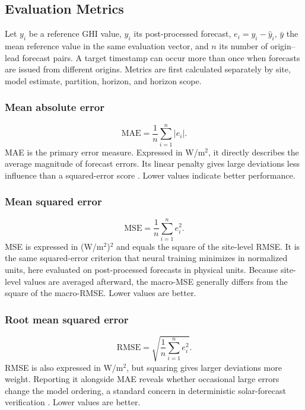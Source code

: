 \subsection{Evaluation Metrics}
\label{sec:metrics}

Let $y_i$ be a reference GHI value, $\widehat{y}_i$ its post-processed
forecast, $e_i=y_i-\widehat{y}_i$, $\bar{y}$ the mean reference value in the
same evaluation vector, and $n$ its number of origin--lead forecast pairs.
A target timestamp can occur more than once when forecasts are issued from
different origins. Metrics are first calculated separately by site, model
estimate, partition, horizon, and horizon scope.

\subsubsection{Mean absolute error}

\begin{equation}
 \mathrm{MAE}
 =
 \frac{1}{n}\sum_{i=1}^{n}\left|e_i\right|.
 \label{eq:mae}
\end{equation}
MAE is the primary error measure. Expressed in W/m$^2$, it directly describes
the average magnitude of forecast errors. Its linear penalty gives large
deviations less influence than a squared-error score \cite{hyndman2006}.
Lower values indicate better performance.

\subsubsection{Mean squared error}

\begin{equation}
 \mathrm{MSE}
 =
 \frac{1}{n}\sum_{i=1}^{n}e_i^2.
 \label{eq:mse}
\end{equation}
MSE is expressed in (W/m$^2$)$^2$ and equals the square of the site-level
RMSE. It is the same squared-error criterion that neural training minimizes
in normalized units, here evaluated on post-processed forecasts in physical
units. Because site-level values are averaged afterward, the macro-MSE
generally differs from the square of the macro-RMSE. Lower values are better.

\subsubsection{Root mean squared error}

\begin{equation}
 \mathrm{RMSE}
 =
 \sqrt{\frac{1}{n}\sum_{i=1}^{n}e_i^2}.
 \label{eq:rmse}
\end{equation}
RMSE is also expressed in W/m$^2$, but squaring gives larger deviations more
weight. Reporting it alongside MAE reveals whether occasional large errors
change the model ordering, a standard concern in deterministic solar-forecast
verification \cite{yang2020verification}. Lower values are better.

